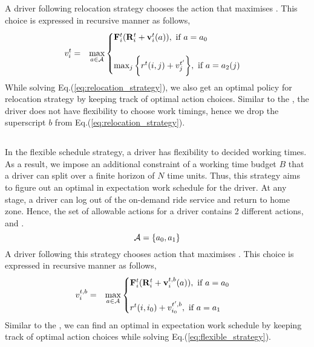 A driver following relocation strategy chooses the action that maximises {\totalexpectedearnings}. This choice is expressed in recursive manner as follows,
\begin{eqnarray}
\label{eq:relocation_strategy}
v_{i}^{t} &=& \max_{a \in \mathcal{A}}
    \begin{cases}
    {\ensuremath{\mathbf{F}}}_{i}^{t} ({\mathbf{R}}_{i}^{t} +  \mathbf{v}_{i}^{t}({a})), \textrm{  if } a = a_0\\ \\
    \max_{j} \bigg\{r^t(i,j) + v_{j}^{t'}\bigg\}, \textrm{  if } a = a_2(j)
    \end{cases}
\end{eqnarray}
While solving Eq.(\ref{eq:relocation_strategy}), we also get an optimal policy for relocation strategy by keeping track of optimal action choices. Similar to the {\naive}, the driver does not have flexibility to choose work timings, hence we drop the superscript $b$ from Eq.(\ref{eq:relocation_strategy}).

\subsection{\flexible}

In the flexible schedule strategy, a driver has flexibility to decided working times. As a result, we impose an additional constraint of a working time budget $B$ that a driver can split over a finite horizon of $N$ time units. Thus, this strategy aims to figure out an optimal in expectation work schedule for the driver. At any stage, a driver can log out of the on-demand ride service and return to home zone. Hence, the set of allowable actions for a driver contains 2 different actions, {\getpassenger} and {\gohome}. 
\begin{equation}
\mathcal{A} = \{a_0, a_1\}
\end{equation}
A driver following this strategy chooses action that maximises {\totalexpectedearnings}. This choice is expressed in recursive manner as follows,
\begin{eqnarray}
\label{eq:flexible_strategy}
v_{i}^{t,b} &=& \max_{a \in \mathcal{A}}
    \begin{cases}
    {\ensuremath{\mathbf{F}}}_{i}^{t} ({\mathbf{R}}_{i}^{t} +  \mathbf{v}_{i}^{t,b}({a})), \textrm{  if } a = a_0\\ \\
    r^t(i,{i_0}) + v_{{i_0}}^{t',b}, \textrm{  if } a = a_1
    \end{cases}
\end{eqnarray}
Similar to the {\relocation}, we can find an optimal in expectation work schedule by keeping track of optimal action choices while solving Eq.(\ref{eq:flexible_strategy}).

